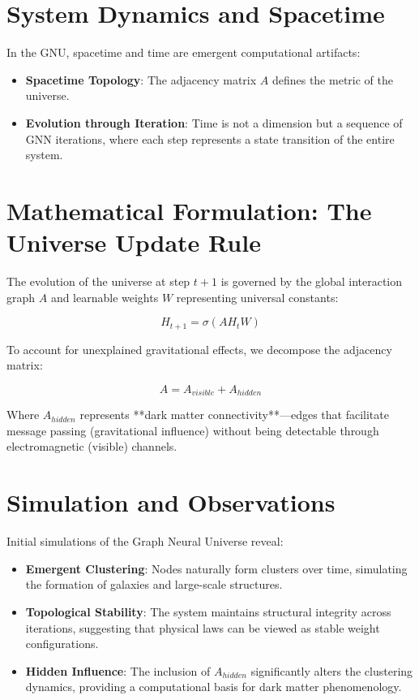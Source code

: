 \documentclass[12pt]{article}
\begin{document}
\section{System Dynamics and Spacetime}

In the GNU, spacetime and time are emergent computational artifacts:
\begin{itemize}
\item \textbf{Spacetime Topology}: The adjacency matrix $A$ defines the metric of the universe.
\item \textbf{Evolution through Iteration}: Time is not a dimension but a sequence of GNN iterations, where each step represents a state transition of the entire system.
\end{itemize}

\section{Mathematical Formulation: The Universe Update Rule}

The evolution of the universe at step $t+1$ is governed by the global interaction graph $A$ and learnable weights $W$ representing universal constants:

\[
H_{t+1} = \sigma(A H_t W)
\]

To account for unexplained gravitational effects, we decompose the adjacency matrix:

\[
A = A_{visible} + A_{hidden}
\]

Where $A_{hidden}$ represents **dark matter connectivity**—edges that facilitate message passing (gravitational influence) without being detectable through electromagnetic (visible) channels.

\section{Simulation and Observations}

Initial simulations of the Graph Neural Universe reveal:
\begin{itemize}
\item \textbf{Emergent Clustering}: Nodes naturally form clusters over time, simulating the formation of galaxies and large-scale structures.
\item \textbf{Topological Stability}: The system maintains structural integrity across iterations, suggesting that physical laws can be viewed as stable weight configurations.
\item \textbf{Hidden Influence}: The inclusion of $A_{hidden}$ significantly alters the clustering dynamics, providing a computational basis for dark matter phenomenology.
\end{itemize}
\end{document}
